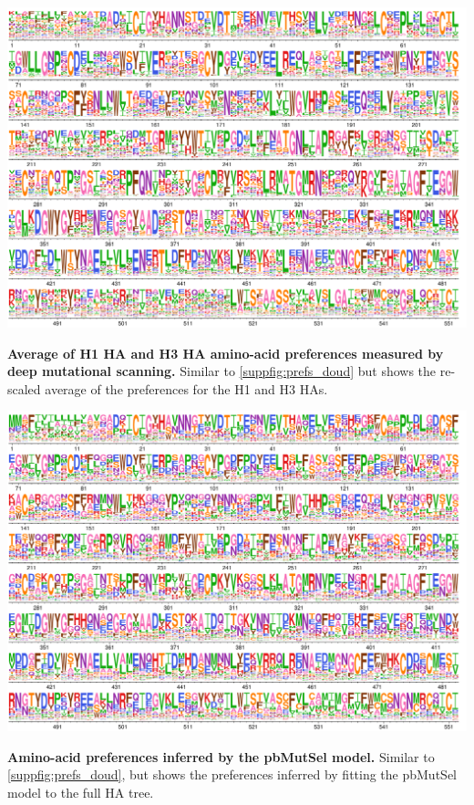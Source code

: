 \documentclass[11pt]{article}
\begin{document}
\begin{suppfig}[H]
\centerline{\includegraphics[width=\textwidth]{figures/prefs_average}}
\caption{\label{suppfig:prefs_average}
\textbf{Average of H1 HA  and H3 HA amino-acid preferences measured by deep mutational scanning.}
Similar to \ref{suppfig:prefs_doud} but shows the re-scaled average of the preferences for the H1 and H3 HAs.
}
\end{suppfig}
\clearpage 

\begin{suppfig}[H]
\centerline{\includegraphics[width=\textwidth]{figures/prefs_mutSel}}
\caption{\label{suppfig:prefs_mutSel}
\textbf{Amino-acid preferences inferred by the pbMutSel model.}
Similar to \ref{suppfig:prefs_doud}, but shows the preferences inferred by fitting the pbMutSel model to the full HA tree.
}
\end{suppfig}
\clearpage 
\end{document}
